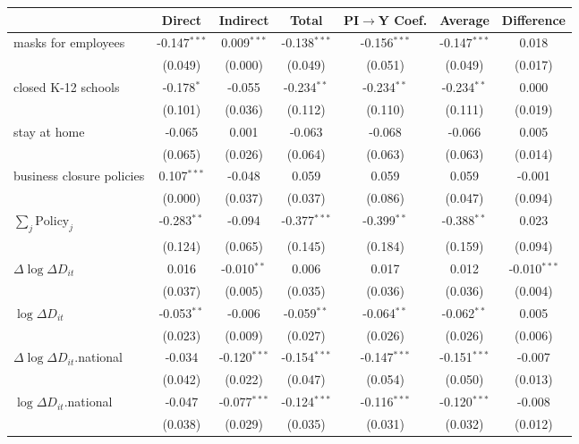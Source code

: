 
\begin{tabular}{lccccc|>{}c}
\toprule
  & Direct & Indirect & Total & PI$\to$Y Coef. & Average & Difference\\
\midrule
masks for employees & -0.147$^{***}$ & 0.009$^{***}$ & -0.138$^{***}$ & -0.156$^{***}$ & -0.147$^{***}$ & 0.018\\
 & (0.049) & (0.000) & (0.049) & (0.051) & (0.049) & (0.017)\\
closed K-12 schools & -0.178$^{*}$ & -0.055 & -0.234$^{**}$ & -0.234$^{**}$ & -0.234$^{**}$ & 0.000\\
 & (0.101) & (0.036) & (0.112) & (0.110) & (0.111) & (0.019)\\
stay at home & -0.065 & 0.001 & -0.063 & -0.068 & -0.066 & 0.005\\
 & (0.065) & (0.026) & (0.064) & (0.063) & (0.063) & (0.014)\\
business closure policies & 0.107$^{***}$ & -0.048 & 0.059 & 0.059 & 0.059 & -0.001\\
 & (0.000) & (0.037) & (0.037) & (0.086) & (0.047) & (0.094)\\
$\sum_j \mathrm{Policy}_j$ & -0.283$^{**}$ & -0.094 & -0.377$^{***}$ & -0.399$^{**}$ & -0.388$^{**}$ & 0.023\\
 & (0.124) & (0.065) & (0.145) & (0.184) & (0.159) & (0.094)\\
$\Delta \log \Delta D_{it}$ & 0.016 & -0.010$^{**}$ & 0.006 & 0.017 & 0.012 & -0.010$^{***}$\\
 & (0.037) & (0.005) & (0.035) & (0.036) & (0.036) & (0.004)\\
$\log \Delta D_{it}$ & -0.053$^{**}$ & -0.006 & -0.059$^{**}$ & -0.064$^{**}$ & -0.062$^{**}$ & 0.005\\
 & (0.023) & (0.009) & (0.027) & (0.026) & (0.026) & (0.006)\\
$\Delta \log \Delta D_{it}$.national & -0.034 & -0.120$^{***}$ & -0.154$^{***}$ & -0.147$^{***}$ & -0.151$^{***}$ & -0.007\\
 & (0.042) & (0.022) & (0.047) & (0.054) & (0.050) & (0.013)\\
$\log \Delta D_{it}$.national & -0.047 & -0.077$^{***}$ & -0.124$^{***}$ & -0.116$^{***}$ & -0.120$^{***}$ & -0.008\\
 & (0.038) & (0.029) & (0.035) & (0.031) & (0.032) & (0.012)\\
\bottomrule
\end{tabular}